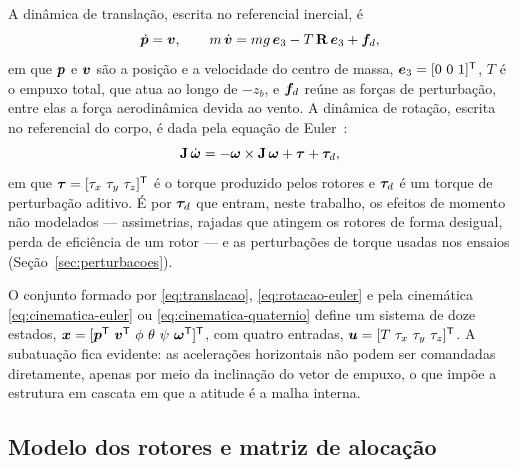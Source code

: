 A dinâmica de translação, escrita no referencial inercial, é
\begin{equation}
\dot{\bm{p}} = \bm{v}, \qquad
m\,\dot{\bm{v}} = m g\,\bm{e}_3 - T\,\mathbf{R}\,\bm{e}_3 + \bm{f}_d,
\label{eq:translacao}
\end{equation}
em que $\bm{p}$ e $\bm{v}$ são a posição e a velocidade do centro de
massa, $\vetor{e}_3 = [0\ 0\ 1]^{\mathsf{T}}$, $T$ é o empuxo total, que atua
ao longo de $-z_b$, e $\bm{f}_d$ reúne as forças de perturbação, entre elas
a força aerodinâmica devida ao vento. A dinâmica de rotação, escrita no
referencial do corpo, é dada pela equação de Euler~\cite{beard2008,beard2012}:
\begin{equation}
\mathbf{J}\,\dot{\bm{\omega}} =
-\bm{\omega}\times\mathbf{J}\,\bm{\omega} + \bm{\tau} + \bm{\tau}_d,
\label{eq:rotacao-euler}
\end{equation}
em que $\vetor{\tau} = [\tau_x\ \tau_y\ \tau_z]^{\mathsf{T}}$ é o torque
produzido pelos rotores e $\bm{\tau}_d$ é um torque de perturbação aditivo.
É por $\bm{\tau}_d$ que entram, neste trabalho, os efeitos de momento não
modelados --- assimetrias, rajadas que atingem os rotores de forma desigual,
perda de eficiência de um rotor --- e as perturbações de torque usadas nos
ensaios (Seção~\ref{sec:perturbacoes}).

O conjunto formado por \eqref{eq:translacao}, \eqref{eq:rotacao-euler} e pela
cinemática \eqref{eq:cinematica-euler} ou \eqref{eq:cinematica-quaternio}
define um sistema de doze estados,
$\bm{x} = [\bm{p}^{\mathsf{T}}\ \bm{v}^{\mathsf{T}}\
\phi\ \theta\ \psi\ \bm{\omega}^{\mathsf{T}}]^{\mathsf{T}}$, com quatro
entradas, $\vetor{u} = [T\ \tau_x\ \tau_y\ \tau_z]^{\mathsf{T}}$. A
subatuação fica evidente: as acelerações horizontais não podem ser comandadas
diretamente, apenas por meio da inclinação do vetor de empuxo, o que impõe a
estrutura em cascata em que a atitude é a malha interna.

\subsection{Modelo dos rotores e matriz de alocação}

